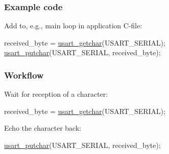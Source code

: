 \hypertarget{usart_use_case_1_usart_use_case_1_usage_code}{}\subsubsection{Example code}\label{usart_use_case_1_usart_use_case_1_usage_code}
Add to, e.\-g., main loop in application C-\/file\-: 
\begin{DoxyCode}
        received\_byte = \hyperlink{group__usart__group_ga194074a7bb28e694e22b604a5df7508f}{usart\_getchar}(USART\_SERIAL);
        \hyperlink{group__usart__group_gaf3c57d5ee2bacfbc36338e64ca8107a6}{usart\_putchar}(USART\_SERIAL, received\_byte);
\end{DoxyCode}
\hypertarget{usart_use_case_1_usart_use_case_1_usage_flow}{}\subsubsection{Workflow}\label{usart_use_case_1_usart_use_case_1_usage_flow}

\begin{DoxyEnumerate}
\item Wait for reception of a character\-:
\begin{DoxyItemize}
\item 
\begin{DoxyCode}
 received\_byte = \hyperlink{group__usart__group_ga194074a7bb28e694e22b604a5df7508f}{usart\_getchar}(USART\_SERIAL); 
\end{DoxyCode}

\end{DoxyItemize}
\item Echo the character back\-:
\begin{DoxyItemize}
\item 
\begin{DoxyCode}
 \hyperlink{group__usart__group_gaf3c57d5ee2bacfbc36338e64ca8107a6}{usart\_putchar}(USART\_SERIAL, received\_byte); 
\end{DoxyCode}
 
\end{DoxyItemize}
\end{DoxyEnumerate}